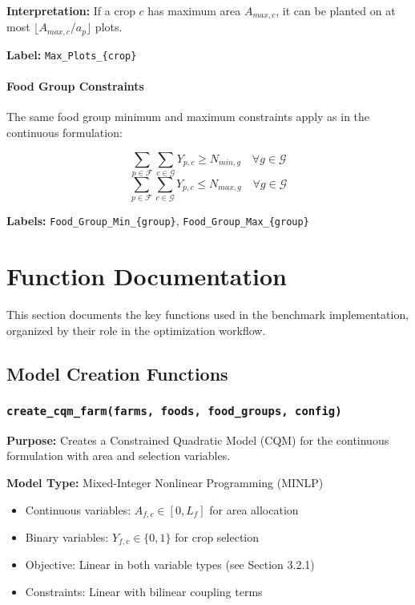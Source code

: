 \documentclass{article}
\begin{document}
\textbf{Interpretation:} If a crop $c$ has maximum area $A_{max,c}$, it can be planted on at most $\lfloor A_{max,c} / a_p \rfloor$ plots.


\textbf{Label:} \texttt{Max\_Plots\_\{crop\}}




\paragraph{Food Group Constraints}

The same food group minimum and maximum constraints apply as in the continuous formulation:

$$\sum_{p \in \mathcal{F}}\sum_{c \in \mathcal{G}} Y_{p,c} \geq N_{min,g} \quad \forall g \in \mathcal{G}$$
$$\sum_{p \in \mathcal{F}}\sum_{c \in \mathcal{G}} Y_{p,c} \leq N_{max,g} \quad \forall g \in \mathcal{G}$$

\textbf{Labels:} \texttt{Food\_Group\_Min\_\{group\}}, \texttt{Food\_Group\_Max\_\{group\}}

\section{Function Documentation}

This section documents the key functions used in the benchmark implementation, organized by their role in the optimization workflow.

\subsection{Model Creation Functions}

\subsubsection{\texttt{create\_cqm\_farm(farms, foods, food\_groups, config)}}

\textbf{Purpose:} Creates a Constrained Quadratic Model (CQM) for the continuous formulation with area and selection variables.

\textbf{Model Type:} Mixed-Integer Nonlinear Programming (MINLP)
\begin{itemize}
    \item Continuous variables: $A_{f,c} \in [0, L_f]$ for area allocation
    \item Binary variables: $Y_{f,c} \in \{0,1\}$ for crop selection
    \item Objective: Linear in both variable types (see Section 3.2.1)
    \item Constraints: Linear with bilinear coupling terms
\end{itemize}
\end{document}
